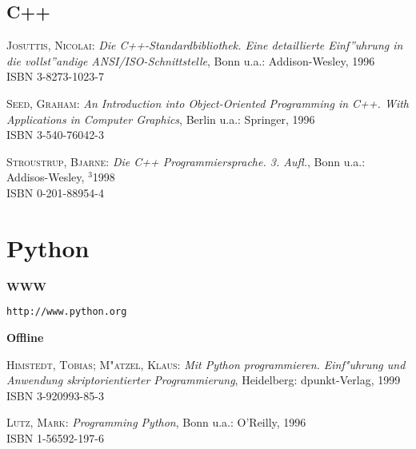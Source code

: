 
\subsection{C++}

\begin{description}
  
\item \textsc{Josuttis, Nicolai}: \textit{Die C++-Standardbibliothek.
    Eine detaillierte Einf''uhrung in die vollst''andige
    ANSI/ISO-Schnittstelle},
  Bonn u.a.: Addison-Wesley, 1996 \\
  ISBN 3-8273-1023-7
  
\item \textsc{Seed, Graham}: \textit{An Introduction into
    Object-Oriented Programming in C++. With Applications in Computer
    Graphics}, Berlin u.a.:
  Springer, 1996 \\
  ISBN 3-540-76042-3
  
\item \textsc{Stroustrup, Bjarne}: \textit{Die C++ Programmiersprache.
    3. Aufl.},
  Bonn u.a.: Addisos-Wesley, $^3$1998 \\
  ISBN 0-201-88954-4

\end{description}


\section{Python}

\textbf{WWW}

\begin{description}
  
\item \texttt{http://www.python.org}

\end{description}

\noindent 
\textbf{Offline}

\begin{description}
  
\item \textsc{Himstedt, Tobias; M"atzel, Klaus}: \textit{Mit Python
    programmieren. Einf"uhrung und Anwendung skriptorientierter
    Programmierung},
  Heidelberg: dpunkt-Verlag, 1999 \\
  ISBN 3-920993-85-3
  
\item \textsc{Lutz, Mark}: \textit{Programming Python},
  Bonn u.a.: O'Reilly, 1996 \\
  ISBN 1-56592-197-6

\end{description}


